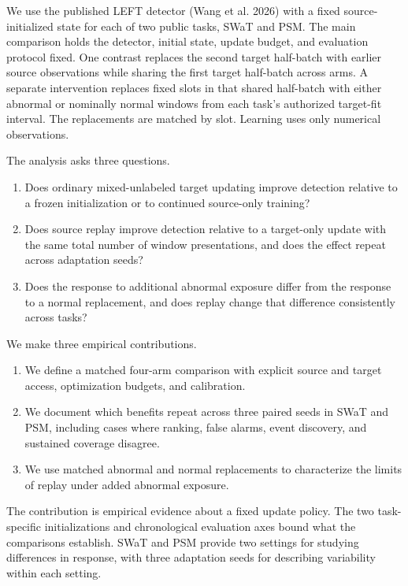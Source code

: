 \documentclass[
  american,
]{article}
\providecommand{\tightlist}{%
  \setlength{\itemsep}{0pt}\setlength{\parskip}{0pt}}
\begin{document}
We use the published LEFT detector (Wang et al. 2026) with a fixed
source-initialized state for each of two public tasks, SWaT and PSM. The
main comparison holds the detector, initial state, update budget, and
evaluation protocol fixed. One contrast replaces the second target
half-batch with earlier source observations while sharing the first
target half-batch across arms. A separate intervention replaces fixed
slots in that shared half-batch with either abnormal or nominally normal
windows from each task's authorized target-fit interval. The
replacements are matched by slot. Learning uses only numerical
observations.

The analysis asks three questions.

\begin{enumerate}
\def\labelenumi{\arabic{enumi}.}
\tightlist
\item
  Does ordinary mixed-unlabeled target updating improve detection
  relative to a frozen initialization or to continued source-only
  training?
\item
  Does source replay improve detection relative to a target-only update
  with the same total number of window presentations, and does the
  effect repeat across adaptation seeds?
\item
  Does the response to additional abnormal exposure differ from the
  response to a normal replacement, and does replay change that
  difference consistently across tasks?
\end{enumerate}

We make three empirical contributions.

\begin{enumerate}
\def\labelenumi{\arabic{enumi}.}
\tightlist
\item
  We define a matched four-arm comparison with explicit source and
  target access, optimization budgets, and calibration.
\item
  We document which benefits repeat across three paired seeds in SWaT
  and PSM, including cases where ranking, false alarms, event discovery,
  and sustained coverage disagree.
\item
  We use matched abnormal and normal replacements to characterize the
  limits of replay under added abnormal exposure.
\end{enumerate}

The contribution is empirical evidence about a fixed update policy. The
two task-specific initializations and chronological evaluation axes
bound what the comparisons establish. SWaT and PSM provide two settings
for studying differences in response, with three adaptation seeds for
describing variability within each setting.
\end{document}
